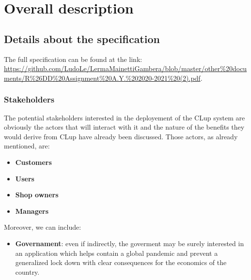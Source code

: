 \section{Overall description}
\label{sect:overalldescription}



\subsection{Details about the specification}
\label{subsect:furtherdetailsaboutspecification}

The full specification can be found at the link: \url{https://github.com/LudoLe/LermaMainettiGambera/blob/master/other%20documents/R%26DD%20Assignment%20A.Y.%202020-2021%20(2).pdf}.
\label{specification}

\subsubsection{Stakeholders}
\label{subsubsect:stakeholders}

The potential stakeholders interested in the deployement of the CLup system are obviously the actors that will interact with it and the nature of the benefits they would derive from CLup have already been discussed. Those actors, as already mentioned, are:
\begin{itemize}[topsep=0pt]
    \item \textbf{Customers}
    \item \textbf{Users}
    \item \textbf{Shop owners}
    \item \textbf{Managers}
\end{itemize}
Moreover, we can include:
\begin{itemize}[topsep=0pt]
    \item \textbf{Governament}: even if indirectly, the goverment may be surely interested in an application which helps contain a global pandemic and prevent a generalized lock down with clear consequences for the economics of the country.
\end{itemize}

